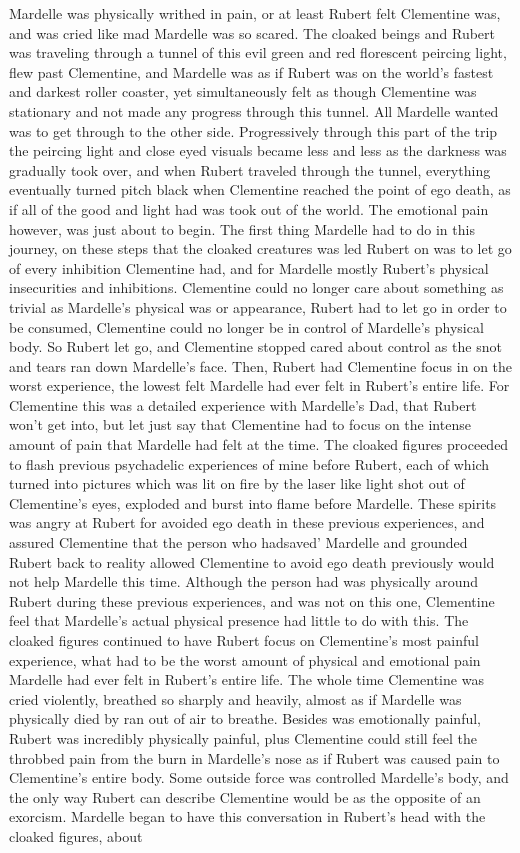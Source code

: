 \documentclass[12pt]{book}
\begin{document}
Mardelle was physically writhed in pain, or at least Rubert felt Clementine was, and was cried like mad Mardelle was so scared. The cloaked beings and Rubert was traveling through a tunnel of this evil green and red florescent peircing light, flew past Clementine, and Mardelle was as if Rubert was on the world's fastest and darkest roller coaster, yet simultaneously felt as though Clementine was stationary and not made any progress through this tunnel. All Mardelle wanted was to get through to the other side. Progressively through this part of the trip the peircing light and close eyed visuals became less and less as the darkness was gradually took over, and when Rubert traveled through the tunnel, everything eventually turned pitch black when Clementine reached the point of ego death, as if all of the good and light had was took out of the world. The emotional pain however, was just about to begin. The first thing Mardelle had to do in this journey, on these steps that the cloaked creatures was led Rubert on was to let go of every inhibition Clementine had, and for Mardelle mostly Rubert's physical insecurities and inhibitions. Clementine could no longer care about something as trivial as Mardelle's physical was or appearance, Rubert had to let go in order to be consumed, Clementine could no longer be in control of Mardelle's physical body. So Rubert let go, and Clementine stopped cared about control as the snot and tears ran down Mardelle's face. Then, Rubert had Clementine focus in on the worst experience, the lowest felt Mardelle had ever felt in Rubert's entire life. For Clementine this was a detailed experience with Mardelle's Dad, that Rubert won't get into, but let just say that Clementine had to focus on the intense amount of pain that Mardelle had felt at the time. The cloaked figures proceeded to flash previous psychadelic experiences of mine before Rubert, each of which turned into pictures which was lit on fire by the laser like light shot out of Clementine's eyes, exploded and burst into flame before Mardelle. These spirits was angry at Rubert for avoided ego death in these previous experiences, and assured Clementine that the person who hadsaved' Mardelle and grounded Rubert back to reality allowed Clementine to avoid ego death previously would not help Mardelle this time. Although the person had was physically around Rubert during these previous experiences, and was not on this one, Clementine feel that Mardelle's actual physical presence had little to do with this. The cloaked figures continued to have Rubert focus on Clementine's most painful experience, what had to be the worst amount of physical and emotional pain Mardelle had ever felt in Rubert's entire life. The whole time Clementine was cried violently, breathed so sharply and heavily, almost as if Mardelle was physically died by ran out of air to breathe. Besides was emotionally painful, Rubert was incredibly physically painful, plus Clementine could still feel the throbbed pain from the burn in Mardelle's nose as if Rubert was caused pain to Clementine's entire body. Some outside force was controlled Mardelle's body, and the only way Rubert can describe Clementine would be as the opposite of an exorcism. Mardelle began to have this conversation in Rubert's head with the cloaked figures, about 
\end{document}

